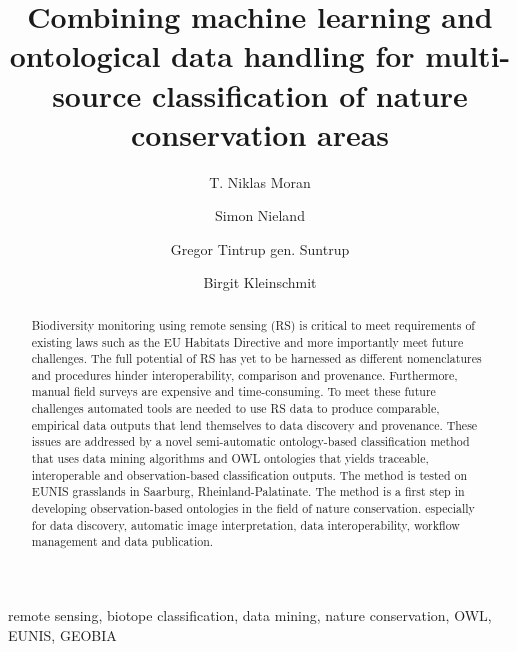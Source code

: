 \documentclass[authoryear,review,12pt,number]{elsarticle}
\begin{document}
\begin{frontmatter}
\title{Combining machine learning and ontological data handling for multi-source
classification of nature conservation areas}

\author[TUB]{T. Niklas Moran}

\author[TUB]{Simon Nieland}
\author[RLP]{Gregor Tintrup gen. Suntrup}
\author[TUB]{Birgit Kleinschmit}

\address[TUB]{Geoinformation in Environmental Planning Lab, Technische
Universit\"at Berlin, Stra\ss e des 17. Juni 145, 10623 Berlin, Germany}

\address[RLP]{Dept. Environmental Systems, RLP AgroScience - Institute for 
Agroecology, Breitenweg 81 67435 Neustadt, Germany}


\begin{abstract}
Biodiversity monitoring using remote sensing (RS) is critical to meet 
requirements of existing laws such as the EU Habitats Directive and more 
importantly meet future challenges. The full potential of RS has yet to be 
harnessed as different nomenclatures and procedures hinder interoperability, 
comparison and provenance. Furthermore, manual field surveys are expensive 
and time-consuming. To meet these future challenges automated tools are needed 
to use RS data to produce comparable, empirical data outputs that lend 
themselves to data discovery and provenance. These issues are addressed by a 
novel semi-automatic ontology-based classification method that uses data mining 
algorithms and OWL ontologies that yields traceable, interoperable and 
observation-based classification outputs. The method is tested on EUNIS 
grasslands in Saarburg, Rheinland-Palatinate. The method is a first step in 
developing observation-based ontologies in the field of nature conservation. 
especially for data discovery, automatic image interpretation, data 
interoperability, workflow management and data publication.
\end{abstract}

\begin{keyword}
remote sensing, biotope classification, data mining, nature conservation, OWL, 
EUNIS, GEOBIA 
\end{keyword}
\end{frontmatter}
\end{document}

